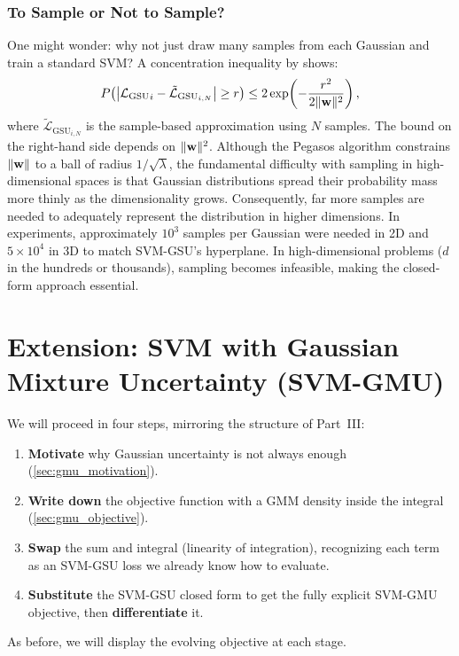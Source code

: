 \documentclass[11pt, letterpaper]{article}
\newcommand{\loss}{\mathcal{L}}
\begin{document}
\section{To Sample or Not to Sample?}\label{sec:sampling}

One might wonder: why not just draw many samples from each Gaussian and train a standard SVM? A concentration inequality by \textcite{cirel2006norms} shows:
\begin{equation}\label{eq:concentration}
    P\!\left(\left|{\loss_{\text{GSU}}}_{i} - \tilde{\loss}_{{\text{GSU}}_{i,N}}\right| \geq r\right) \leq 2\exp\!\left(-\frac{r^2}{2\|\vb{w}\|^2}\right),
\end{equation}
where $\tilde{\loss}_{{\text{GSU}}_{i,N}}$ is the sample-based approximation using $N$ samples. The bound on the right-hand side depends on $\|\vb{w}\|^2$. Although the Pegasos algorithm constrains $\|\vb{w}\|$ to a ball of radius $1/\sqrt{\lambda}$, the fundamental difficulty with sampling in high-dimensional spaces is that Gaussian distributions spread their probability mass more thinly as the dimensionality grows. Consequently, far more samples are needed to adequately represent the distribution in higher dimensions. In experiments, approximately $10^3$ samples per Gaussian were needed in 2D and $5 \times 10^4$ in 3D to match SVM-GSU's hyperplane. In high-dimensional problems ($d$ in the hundreds or thousands), sampling becomes infeasible, making the closed-form approach essential.

\part{Extension: SVM with Gaussian Mixture Uncertainty (SVM-GMU)}

\begin{statusbox}
We will proceed in four steps, mirroring the structure of Part~III:
\begin{enumerate}[leftmargin=1.5em, topsep=2pt, itemsep=1pt]
    \item \textbf{Motivate} why Gaussian uncertainty is not always enough (\cref{sec:gmu_motivation}).
    \item \textbf{Write down} the objective function with a GMM density inside the integral (\cref{sec:gmu_objective}).
    \item \textbf{Swap} the sum and integral (linearity of integration), recognizing each term as an SVM-GSU loss we already know how to evaluate.
    \item \textbf{Substitute} the SVM-GSU closed form to get the fully explicit SVM-GMU objective, then \textbf{differentiate} it.
\end{enumerate}
As before, we will display the evolving objective at each stage.
\end{statusbox}
\end{document}
